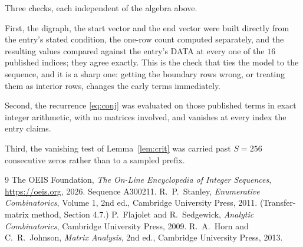 \documentclass[11pt,a4paper]{article}
\theoremstyle{plain}
\theoremstyle{definition}
\begin{document}
Three checks, each independent of the algebra above.

First, the digraph, the start vector and the end vector were built directly from the
entry's stated condition, the one-row count computed separately, and the resulting values
compared against the entry's DATA at every one of the $16$ published indices; they
agree exactly. This is the check that ties the model to the sequence, and it is a sharp one:
getting the boundary rows wrong, or treating them as interior rows, changes the early terms
immediately.

Second, the recurrence \eqref{eq:conj} was evaluated on those published terms in exact
integer arithmetic, with no matrices involved, and vanishes at every index the entry claims.

Third, the vanishing test of Lemma~\ref{lem:crit} was carried past $S=256$ consecutive
zeros rather than to a sampled prefix.

\begin{thebibliography}{9}
 The OEIS Foundation, \emph{The On-Line Encyclopedia of Integer
Sequences}, \url{https://oeis.org}, 2026. Sequence A300211.
 R.~P.~Stanley, \emph{Enumerative Combinatorics}, Volume 1, 2nd ed.,
Cambridge University Press, 2011. (Transfer-matrix method, Section 4.7.)
 P.~Flajolet and R.~Sedgewick, \emph{Analytic Combinatorics}, Cambridge
University Press, 2009.
 R.~A.~Horn and C.~R.~Johnson, \emph{Matrix Analysis}, 2nd ed., Cambridge
University Press, 2013.
\end{thebibliography}
\end{document}
